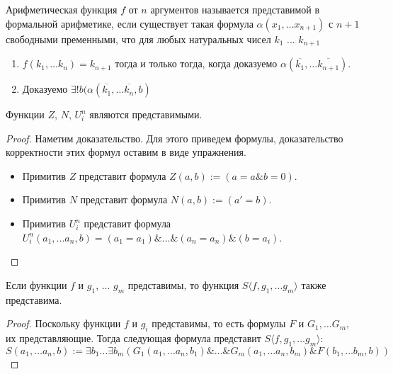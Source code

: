 \begin{definition} Арифметическая функция $f$ от $n$ аргументов называется представимой в 
формальной арифметике, если существует такая формула $\alpha (x_1, \dots x_{n+1})$ с $n+1$ 
свободными пременными, что для любых натуральных чисел $k_1$ ... $k_{n+1}$
\begin{enumerate}
\item $f(k_1, \dots k_n) = k_{n+1}$ тогда и только тогда, когда доказуемо 
$\alpha (\overline{k_1}, \dots \overline{k_{n+1}})$.
\item Доказуемо $\exists ! b (\alpha (\overline{k_1}, \dots \overline{k_n}, b)$
\end{enumerate}

\end{definition} 


\begin{theorem} Функции $Z$, $N$, $U^n_i$ являются представимыми. \end{theorem}
\begin{proof}
Наметим доказательство. Для этого приведем формулы, доказательство корректности этих 
формул оставим в виде упражнения.
\begin{itemize}
\item Примитив $Z$ представит формула $Z (a, b) := (a=a \& b=0)$.
\item Примитив $N$ представит формула $N (a, b) := (a' = b)$.
\item Примитив $U^n_i$ представит формула $U^n_i (a_1, ...a_n, b) = (a_1=a_1) \& ... \& (a_n=a_n) \& (b= a_i)$.
\end{itemize}
\end{proof}

\begin{theorem} Если функции $f$ и $g_1$, ... $g_m$ представимы, 
то функция $S\langle{}f,g_1,\dots g_m\rangle$ также представима. \end{theorem}
\begin{proof}Поскольку функции $f$ и $g_i$ представимы, то есть формулы $F$ и $G_1, \dots G_m$,
их представляющие. Тогда следующая формула представит $S\langle{}f,g_1,\dots g_m\rangle$: 
$$S (a_1, \dots a_n, b) := \exists b_1 \dots \exists b_m 
  (G_1 (a_1, \dots a_n, b_1) \& \dots \& G_m (a_1, \dots a_n, b_m) \& F (b_1, \dots b_m, b))$$
\end{proof}

